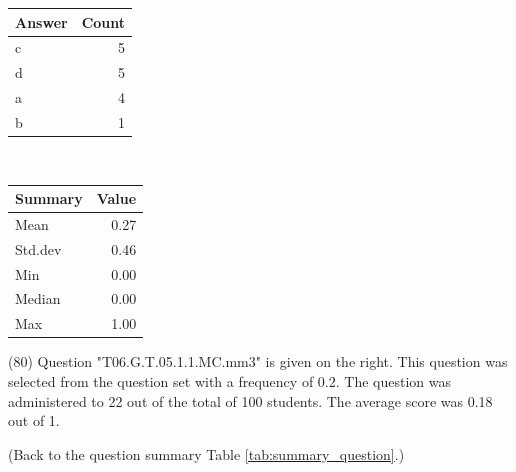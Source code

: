 \documentclass[12pt,nohyper]{tufte-handout}\usepackage[]{graphicx}\usepackage[]{color}
\begin{document}
\begin{center}%
\begin{tabular}{lr}
  \hline
Answer & Count \\ 
  \hline
c &   5 \\ 
  d &   5 \\ 
  a &   4 \\ 
  b &   1 \\ 
   \hline
\end{tabular}
~~~~~~~~%
\begin{tabular}{lr}
  \hline
Summary & Value \\ 
  \hline
Mean & 0.27 \\ 
  Std.dev & 0.46 \\ 
  Min & 0.00 \\ 
  Median & 0.00 \\ 
  Max & 1.00 \\ 
   \hline
\end{tabular}
\end{center}\newpage{} (80) Question "T06.G.T.05.1.1.MC.mm3" is given on the right. This question was selected from the question set with a frequency of 0.2. The question was administered to 22 out of the total of 100 students. The average score was 0.18 out of 1.

 (Back to the question summary Table \ref{tab:summary_question}.)
\end{document}
